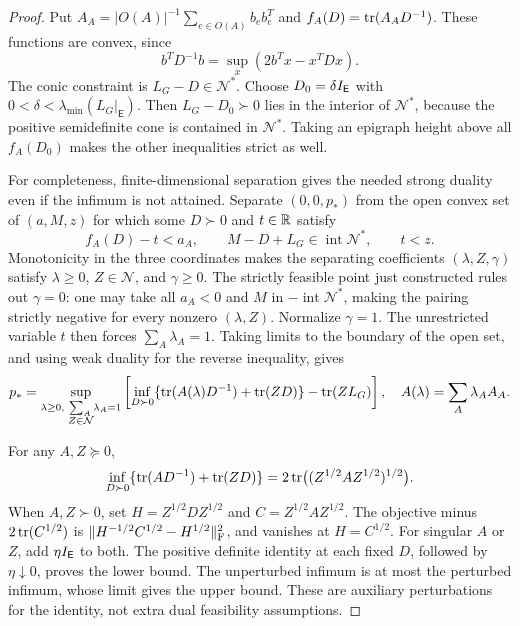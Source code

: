 \begin{proof}
Put $A_A=|O(A)|^{-1}\sum_{e\in O(A)}b_eb_e^T$ and
$f_A(D)=\operatorname{tr}(A_AD^{-1})$.  These functions are convex, since
\[
 b^TD^{-1}b=\sup_x(2b^Tx-x^TDx).
\]
The conic constraint is $L_G-D\in\mathcal N^*$.
Choose $D_0=\delta I_{\mathsf E}$ with
$0<\delta<\lambda_{\min}(L_G|_{\mathsf E})$.
Then $L_G-D_0\succ0$ lies in the interior of $\mathcal N^*$,
because the positive semidefinite cone is contained in
$\mathcal N^*$.  Taking an epigraph height above all $f_A(D_0)$
makes the other inequalities strict as well.

For completeness, finite-dimensional separation gives the needed
strong duality even if the infimum is not attained.  Separate
$(0,0,p_*)$ from the open convex set of $(a,M,z)$ for which some
$D\succ0$ and $t\in\mathbb R$ satisfy
\[
 f_A(D)-t<a_A,\qquad
 M-D+L_G\in\operatorname{int}\mathcal N^*,\qquad t<z.
\]
Monotonicity in the three coordinates makes the separating
coefficients $(\lambda,Z,\gamma)$ satisfy
$\lambda\ge0$, $Z\in\mathcal N$, and $\gamma\ge0$.
The strictly feasible point just constructed rules out $\gamma=0$:
one may take all $a_A<0$ and $M$ in $-\operatorname{int}\mathcal N^*$,
making the pairing strictly negative for every nonzero
$(\lambda,Z)$.  Normalize $\gamma=1$.  The unrestricted variable $t$
then forces $\sum_A\lambda_A=1$.  Taking limits to the boundary of
the open set, and using weak duality for the reverse inequality,
gives
\begin{equation}\label{tg:lagrange}
 p_*=\sup_{\substack{\lambda\ge0,\ \sum_A\lambda_A=1\\Z\in\mathcal N}}
 \left[\inf_{D\succ0}
 \{\operatorname{tr}(A(\lambda)D^{-1})+\operatorname{tr}(ZD)\}-\operatorname{tr}(ZL_G)\right],
 \quad A(\lambda)=\sum_A\lambda_AA_A.
\end{equation}

For any $A,Z\succeq0$,
\begin{equation}\label{tg:matrix-infimum}
 \inf_{D\succ0}\{\operatorname{tr}(AD^{-1})+\operatorname{tr}(ZD)\}
 =2\operatorname{tr}\bigl((Z^{1/2}AZ^{1/2})^{1/2}\bigr).
\end{equation}
When $A,Z\succ0$, set $H=Z^{1/2}DZ^{1/2}$ and
$C=Z^{1/2}AZ^{1/2}$.  The objective minus $2\operatorname{tr}(C^{1/2})$ is
$\lVert H^{-1/2}C^{1/2}-H^{1/2}\rVert_{\mathrm F}^2$, and vanishes at
$H=C^{1/2}$.  For singular $A$ or $Z$, add
$\eta I_{\mathsf E}$ to both.  The positive definite identity at
each fixed $D$, followed by $\eta\downarrow0$, proves the lower
bound.  The unperturbed infimum is at most the perturbed infimum,
whose limit gives the upper bound.  These are auxiliary perturbations
for the identity, not extra dual feasibility assumptions.


\end{proof}
